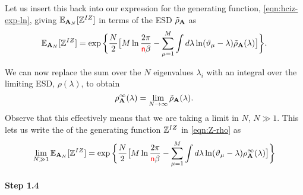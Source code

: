 Let us insert this back into our
expression for the generating function,
\ref{eqn:hciz-exp-ln},   %
giving
$\mathbb{E}_{\mathbf{A}_{N}}[\mathbb{Z}^{IZ}]$ in terms of the ESD $\tilde{\rho}_{\mathbf{A}}$ as
\begin{equation}
\label{eqn:Z-rho}
    \mathbb{E}_{\mathbf{A}_{N}}[\mathbb{Z}^{IZ}]=\exp\bigg\{\dfrac{N}{2}\big[M\ln\dfrac{2\pi}{{\color{red}\sf{n}}\beta}-\sum_{\mu=1}^{M}\int
        d\lambda\ln(\vartheta_{\mu}-\lambda)\tilde{\rho}_{\mathbf{A}}(\lambda)\big]\bigg\}  .
\end{equation}

We can now replace
the sum over the $N$ eigenvalues $\lambda_{i}$ with an integral over the limiting
ESD, $\rho(\lambda)$, to obtain
\begin{equation}
\label{eqn:rho-}
\rho^{\infty}_{\mathbf{A}}(\lambda)=    \lim_{N\rightarrow\infty}\tilde\rho_{\mathbf{A}}(\lambda)  .
\end{equation}
Observe that this effectively means that we are taking a \LargeN limit in $N$, $N\gg 1$.
%
This lets us write the \ExpectedValue of the generating function $\mathbb{Z}^{IZ}$
in \ref{eqn:Z-rho}
as
\begin{equation}
\label{eqn:Z-rho-2}
    \lim_{N\gg 1}\mathbb{E}_{\mathbf{A}_{N}}[\mathbb{Z}^{IZ}]=\exp\bigg\{\dfrac{N}{2}\big[M\ln\dfrac{2\pi}{{\color{red}\sf{n}}\beta}-
    \sum_{\mu=1}^{M}\int
        d\lambda\ln(\vartheta_{\mu}-\lambda)\rho^{\infty}_{\mathbf{A}}(\lambda)\big]\bigg\}
\end{equation}

\paragraph{Step 1.4}

